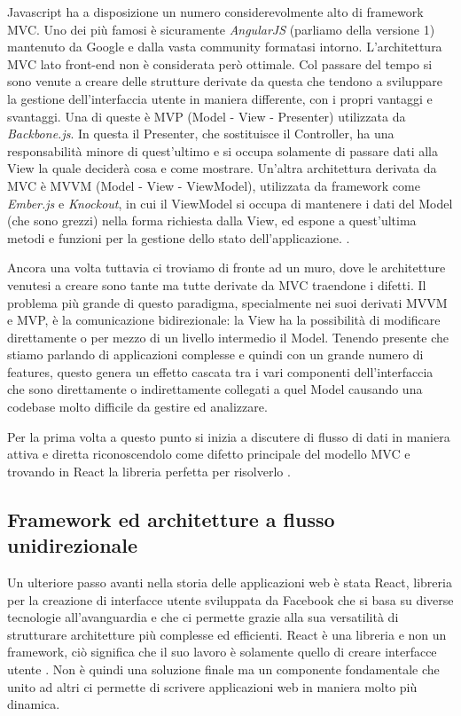 Javascript ha a disposizione un numero considerevolmente alto di framework MVC. Uno dei più famosi è sicuramente \textit{AngularJS} (parliamo della versione 1) mantenuto da Google e dalla vasta community formatasi intorno.
L'architettura MVC lato front-end non è considerata però ottimale. Col passare del tempo si sono venute a creare delle strutture derivate da questa che tendono a sviluppare la gestione dell'interfaccia utente in maniera differente, con i propri vantaggi e svantaggi. Una di queste è MVP (Model - View - Presenter) utilizzata da \textit{Backbone.js}. In questa il Presenter, che sostituisce il Controller, ha una responsabilità minore di quest'ultimo e si occupa solamente di passare dati alla View la quale deciderà cosa e come mostrare. Un'altra architettura derivata da MVC è MVVM (Model - View - ViewModel), utilizzata da framework come \textit{Ember.js} e \textit{Knockout}, in cui il ViewModel si occupa di mantenere i dati del Model (che sono grezzi) nella forma richiesta dalla View, ed espone a quest'ultima metodi e funzioni per la gestione dello stato dell'applicazione. \cite{ChauhanFrontendArchitectures}.

Ancora una volta tuttavia ci troviamo di fronte ad un muro, dove le architetture venutesi a creare sono tante ma tutte derivate da MVC traendone i difetti. Il problema più grande di questo paradigma, specialmente nei suoi derivati MVVM e MVP, è la comunicazione bidirezionale: la View ha la possibilità di modificare direttamente o per mezzo di un livello intermedio il Model. Tenendo presente che stiamo parlando di applicazioni complesse e quindi con un grande numero di features, questo genera un effetto cascata tra i vari componenti dell'interfaccia che sono direttamente o indirettamente collegati a quel Model causando una codebase molto difficile da gestire ed analizzare. 

Per la prima volta a questo punto si inizia a discutere di flusso di dati in maniera attiva e diretta riconoscendolo come difetto principale del modello MVC e trovando in React la libreria perfetta per risolverlo \cite{SalihefendicFluxVsMVC}.

\subsection{Framework ed architetture a flusso unidirezionale}
Un ulteriore passo avanti nella storia delle applicazioni web è stata React, libreria per la creazione di interfacce utente sviluppata da Facebook che si basa su diverse tecnologie all'avanguardia e che ci permette grazie alla sua versatilità di strutturare architetture più complesse ed efficienti.
React è una libreria e non un framework, ciò significa che il suo lavoro è solamente quello di creare interfacce utente \cite{BunaReactIsTheNewFrontend}. Non è quindi una soluzione finale ma un componente fondamentale che unito ad altri ci permette di scrivere applicazioni web in maniera molto più dinamica.

